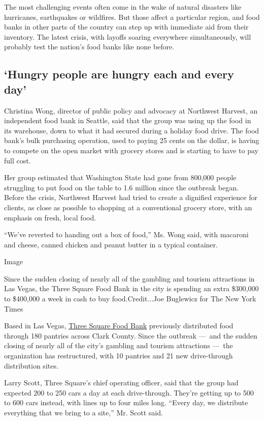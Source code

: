 The most challenging events often come in the wake of natural disasters
like hurricanes, earthquakes or wildfires. But those affect a particular
region, and food banks in other parts of the country can step up with
immediate aid from their inventory. The latest crisis, with layoffs
soaring everywhere simultaneously, will probably test the nation's food
banks like none before.

\hypertarget{hungry-people-are-hungry-each-and-every-day}{%
\subsection{`Hungry people are hungry each and every
day'}\label{hungry-people-are-hungry-each-and-every-day}}

Christina Wong, director of public policy and advocacy at Northwest
Harvest, an independent food bank in Seattle, said that the group was
using up the food in its warehouse, down to what it had secured during a
holiday food drive. The food bank's bulk purchasing operation, used to
paying 25 cents on the dollar, is having to compete on the open market
with grocery stores and is starting to have to pay full cost.

Her group estimated that Washington State had gone from 800,000 people
struggling to put food on the table to 1.6 million since the outbreak
began. Before the crisis, Northwest Harvest had tried to create a
dignified experience for clients, as close as possible to shopping at a
conventional grocery store, with an emphasis on fresh, local food.

``We've reverted to handing out a box of food,'' Ms. Wong said, with
macaroni and cheese, canned chicken and peanut butter in a typical
container.

Image

Since the sudden closing of nearly all of the gambling and tourism
attractions in Las Vegas, the Three Square Food Bank in the city is
spending an extra \$300,000 to \$400,000 a week in cash to buy
food.Credit...Joe Buglewicz for The New York Times

Based in Las Vegas, \href{https://www.threesquare.org/}{Three Square
Food Bank} previously distributed food through 180 pantries across Clark
County. Since the outbreak ---~and the sudden closing of nearly all of
the city's gambling and tourism attractions ---~the organization has
restructured, with 10 pantries and 21 new drive-through distribution
sites.

Larry Scott, Three Square's chief operating officer, said that the group
had expected 200 to 250 cars a day at each drive-through. They're
getting up to 500 to 600 cars instead, with lines up to four miles long.
``Every day, we distribute everything that we bring to a site,'' Mr.
Scott said.

